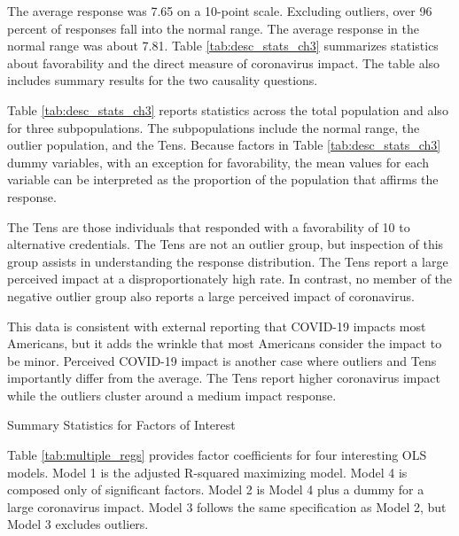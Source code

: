 The average response was 7.65 on a 10-point scale.
Excluding outliers, over 96 percent of responses fall into the normal range.
The average response in the normal range was about 7.81.
Table \ref{tab:desc_stats_ch3} summarizes statistics about favorability and the direct measure of coronavirus impact.
The table also includes summary results for the two causality questions.

Table \ref{tab:desc_stats_ch3} reports statistics across the total population and also for three subpopulations.
The subpopulations include the normal range, the outlier population, and the Tens.
Because factors in Table \ref{tab:desc_stats_ch3} dummy variables,
with an exception for favorability,
the mean values for each variable can be interpreted as the proportion of the population
that affirms the response.

The Tens are those individuals that responded with a favorability of 10 to alternative credentials.
The Tens are not an outlier group, but inspection of this group assists in understanding the response distribution.
The Tens report a large perceived impact at a disproportionately high rate.
In contrast, no member of the negative outlier group also reports a large perceived impact of coronavirus.

This data is consistent with external reporting that COVID-19 impacts most Americans\cite{demographic2020},
but it adds the wrinkle that most Americans consider the impact to be minor.
Perceived COVID-19 impact is another case where outliers and Tens importantly differ from the average.
The Tens report higher coronavirus impact while the outliers cluster around a medium impact response.

\begin{table}
    \caption{Summary Statistics for Factors of Interest}
    \resizebox{\columnwidth}{!}{
        
    }
    \tableSpace
    \label{tab:desc_stats_ch3}
\end{table}

Table \ref{tab:multiple_regs} provides factor coefficients for four interesting OLS models.
Model 1 is the adjusted R-squared maximizing model.
Model 4 is composed only of significant factors.
Model 2 is Model 4 plus a dummy for a large coronavirus impact.
Model 3 follows the same specification as Model 2, but Model 3 excludes outliers.

